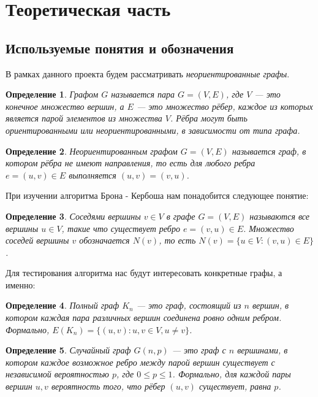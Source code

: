 \documentclass{article}
\newtheorem{theorem}{Определение}
\begin{document}
\newpage
\section{Теоретическая часть}
\subsection{Используемые понятия и обозначения}
В рамках данного проекта будем рассматривать \textit{неориентированные графы}.
\begin{theorem}
Графом \textbf{\( G \)} называется пара \( G = (V, E) \), где \( V \) — это конечное множество вершин, а \( E \) — это множество рёбер, каждое из которых является парой элементов из множества \( V \). Рёбра могут быть ориентированными или неориентированными, в зависимости от типа графа.
\end{theorem}

\begin{theorem}
Неориентированным графом \( G = (V, E) \) называется граф, в котором рёбра не имеют направления, то есть для любого ребра \( e = (u, v) \in E \) выполняется \( (u, v) = (v, u) \). 
\end{theorem}

При изучении алгоритма Брона - Кербоша нам понадобится следующее понятие:

\begin{theorem}
Соседями вершины \( v \in V \) в графе \( G = (V, E) \) называются все вершины \( u \in V \), такие что существует ребро \( e = (v, u) \in E \). Множество соседей вершины \( v \) обозначается \( N(v) \), то есть \( N(v) = \{ u \in V : (v, u) \in E \} \).
\end{theorem}

Для тестирования алгоритма нас будут интересовать конкретные графы, а именно:
\begin{theorem}
Полный граф \( K_n \) — это граф, состоящий из \( n \) вершин, в котором каждая пара различных вершин соединена ровно одним ребром. Формально, \( E(K_n) = \{ (u, v) : u, v \in V, u \neq v \} \).
\end{theorem}

\begin{theorem}
Случайный граф \( G(n, p) \) — это граф с \( n \) вершинами, в котором каждое возможное ребро между парой вершин существует с независимой вероятностью \( p \), где \( 0 \leq p \leq 1 \). Формально, для каждой пары вершин \( u, v \) вероятность того, что рёбер \( (u, v) \) существует, равна \( p \).
\end{theorem}
\end{document}
